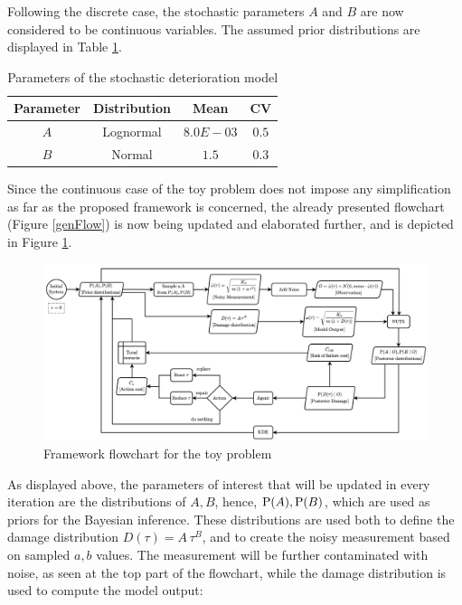 Following the discrete case, the stochastic parameters $A$ and $B$ are now considered to be continuous variables. The assumed prior distributions are displayed in Table \ref{deterParams}.

\begin{table}[H]
    \centering
    \caption{Parameters of the stochastic deterioration model}
    \label{deterParams}
    \begin{tabular}{cccc}
        \toprule
        \textbf{Parameter} & \textbf{Distribution} & \textbf{Mean} & \textbf{\gls{CV}} \\ \midrule
        $A$ & Lognormal & $8.0E-03$ & $0.5$ \\
        $B$ & Normal & $1.5$ & $0.3$ \\ \bottomrule
    \end{tabular}
\end{table}


Since the continuous case of the toy problem does not impose any simplification as far as the proposed framework is concerned, the already presented flowchart (Figure \ref{genFlow}) is now being updated and elaborated further, and is depicted in Figure \ref{flowToy}.

\vspace{1cm}

\begin{figure}[H]
    \centering
	\includegraphics[width=\linewidth]{Figures/toyFlow.png}
	\caption{Framework flowchart for the toy problem}
	\label{flowToy}
\end{figure}

\restoregeometry

As displayed above, the parameters of interest that will be updated in every iteration are the distributions of $A, B$, hence, $\text{P}(A), \text{P}(B)$, which are used as priors for the Bayesian inference. These distributions are used both to define the damage distribution $D(\tau) = A\, \tau ^B$, and to create the noisy measurement based on sampled $a, b$ values. The measurement will be further contaminated with noise, as seen at the top part of the flowchart, while the damage distribution is used to compute the model output:

